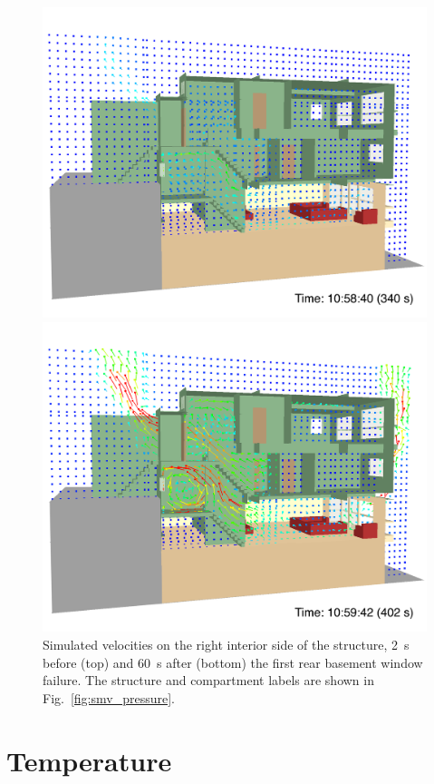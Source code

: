 \documentclass[12pt,oneside]{book}
\begin{document}
\begin{figure}[!ht]
\includegraphics[width=4.5in]{../Figures/SMV_Vel_Vec_340_s}


\includegraphics[width=4.5in]{../Figures/SMV_Vel_Vec_402_s}


\caption[Simulated velocities on the right interior side of the structure.]
{Simulated velocities on the right interior side of the structure, 2~s before (top) and 60~s after (bottom) the first rear basement window failure. The structure and compartment labels are shown in Fig.~\ref{fig:smv_pressure}.}
\label{fig:smv_velocity_vectors}
\end{figure}


\clearpage


\section{Temperature}
\label{sec:temperature}
\end{document}
